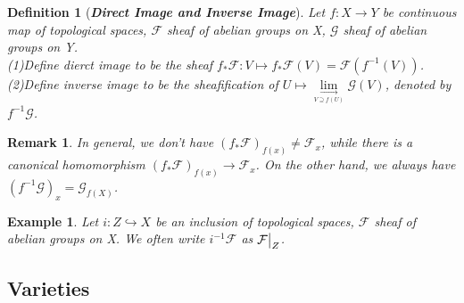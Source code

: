 \documentclass{ctexart}
\newtheorem{definition}{Definition}[section]
\newtheorem{remark}{Remark}[section]
\newtheorem{example}{Example}[section]
\begin{document}
\begin{definition}[\textbf{\emph{Direct Image and Inverse Image}}]
    Let $f:X \longrightarrow Y$ be continuous map of topological spaces, $\mathcal{F}$ sheaf of abelian groups on X, $\mathcal{G}$ sheaf of abelian groups on Y. \\
    (1)Define dierct image to be the sheaf $f_{\ast}\mathcal{F}: V \longmapsto f_{\ast}\mathcal{F}(V) = \mathcal{F}(f^{-1}(V))$. \\
    (2)Define inverse image to be the sheafification of $U \longmapsto \underset{\underset{V \supseteq f(U)}{\longrightarrow}}{\lim} \mathcal{G}(V)$, denoted by $f^{-1}\mathcal{G}$.
\end{definition}
\begin{remark}
    In general, we don't have $(f_{\ast}\mathcal{F})_{f(x)} \neq \mathcal{F}_{x}$,
    while there is a canonical homomorphism $(f_{\ast}\mathcal{F})_{f(x)} \longrightarrow \mathcal{F}_{x}$.
    On the other hand, we always have $(f^{-1}\mathcal{G})_{x} = \mathcal{G}_{f(X)}$.
\end{remark}
\begin{example}
    Let $i: Z \hookrightarrow X$ be an inclusion of topological spaces, $\mathcal{F}$ sheaf of abelian groups on X.
    We often write $i^{-1}\mathcal{F}$ as $\mathcal{F}\big{|}_{Z}$.
\end{example}

\subsection{Varieties}
\label{subsection:Schemes_Varieties}
\end{document}
